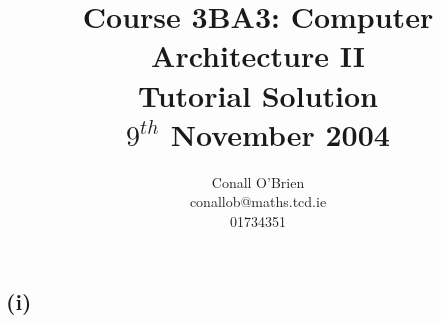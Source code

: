 \documentclass[a4paper,12pt]{article}
\begin{document}
\title{Course 3BA3: Computer Architecture II \\ Tutorial Solution\\$9^{th}$ November 2004}

\author{Conall O'Brien \\ conallob@maths.tcd.ie \\ 01734351}

\maketitle

\section{}

\subsection*{(i)}
\end{document}
